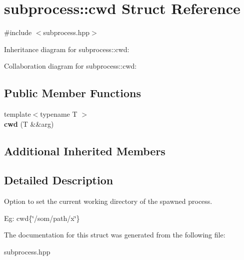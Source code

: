 \hypertarget{structsubprocess_1_1cwd}{}\section{subprocess\+:\+:cwd Struct Reference}
\label{structsubprocess_1_1cwd}


{\ttfamily \#include $<$subprocess.\+hpp$>$}



Inheritance diagram for subprocess\+:\+:cwd\+:


Collaboration diagram for subprocess\+:\+:cwd\+:
\subsection*{Public Member Functions}
\begin{DoxyCompactItemize}
\item 
\mbox{\label{structsubprocess_1_1cwd_a54f79e88b05e930d01a034cf58ef1a87}} 
{\footnotesize template$<$typename T $>$ }\\{\bfseries cwd} (T \&\&arg)
\end{DoxyCompactItemize}
\subsection*{Additional Inherited Members}


\subsection{Detailed Description}
Option to set the current working directory of the spawned process.

Eg\+: cwd\{\char`\"{}/som/path/x\char`\"{}\} 

The documentation for this struct was generated from the following file\+:\begin{DoxyCompactItemize}
\item 
subprocess.\+hpp\end{DoxyCompactItemize}
